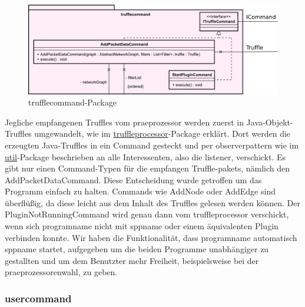       \begin{figure}[H]
        \centering
        \includegraphics[width=\textwidth]{../diagramimages/trufflecommand.png}
        \caption{trufflecommand-Package}
      \end{figure}

      \medskip
      Jegliche empfangenen Truffles vom \gls{praeprozessor} werden zuerst in Java-Objekt-Truffles umgewandelt, wie
      im \hyperref[subsubsec:truffleprocessor]{truffleprocessor}-Package erklärt. Dort
      werden die erzeugten Java-Truffles in ein Command gesteckt und per \gls{observerpattern}
      wie im \hyperref[subsec:util]{util}-Package beschrieben an alle Interessenten, also die \gls{listener}, verschickt.
      \newline
      \newline
      Es gibt nur einen Command-Typen für die empfangen Truffle-\glspl{paket}, nämlich den
      AddPacketDataCommand. Diese Entscheidung wurde getroffen um das Programm einfach
      zu halten. Commands wie AddNode oder AddEdge sind überflüßig, da diese leicht aus
      dem Inhalt des Truffles gelesen werden können.
      \newline
      \newline
      Der PluginNotRunningCommand wird genau dann vom truffleprocessor verschickt, wenn sich \gls{programname}
      nicht mit \gls{sppname} oder einem äquivalenten Plugin verbinden konnte. Wir
      haben die Funktionalität, dass \gls{programname} automatisch \gls{sppname} startet,
      aufgegeben um die beiden Programme unabhängiger zu gestallten und um dem Benutzter
      mehr Freiheit, beispielsweise bei der \gls{praeprozessor}enwahl, zu geben.

      \subsubsection{usercommand}
      \label{subsubsec:usercommand}

